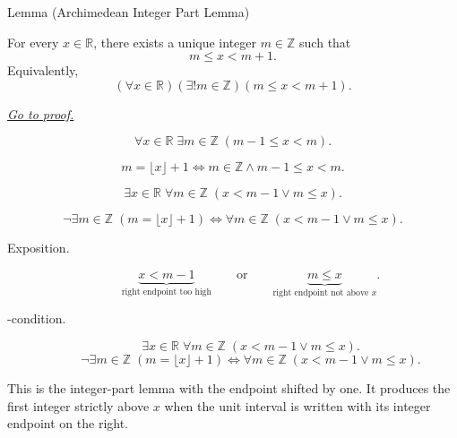 \begin{lemmabox}{Lemma (Archimedean Integer Part Lemma)}
\begin{lemma}
\label{lem:archimedean-integer-part-lemma}
For every $x\in\mathbb{R}$, there exists a unique integer $m\in\mathbb{Z}$
such that
\[
  m\leq x<m+1.
\]
Equivalently,
\[
  (\forall x\in\mathbb{R})(\exists!m\in\mathbb{Z})(m\leq x<m+1).
\]

\smallskip
\noindent
\hyperref[prf:archimedean-integer-part-lemma]{\textit{Go to proof.}}
\end{lemma}
\end{lemmabox}

\begin{remark*}
\[
\forall x\in\mathbb{R}\;\exists m\in\mathbb{Z}\;(m-1\le x<m).
\]
\end{remark*}

\begin{remark*}
\[
m=\lfloor x\rfloor+1
\Longleftrightarrow
m\in\mathbb{Z}\land m-1\le x<m.
\]
\end{remark*}

\begin{remark*}
\[
\exists x\in\mathbb{R}\;\forall m\in\mathbb{Z}\;(x<m-1\lor m\le x).
\]
\end{remark*}

\begin{remark*}
\[
\neg\exists m\in\mathbb{Z}\;(m=\lfloor x\rfloor+1)
\Longleftrightarrow
\forall m\in\mathbb{Z}\;(x<m-1\lor m\le x).
\]
\end{remark*}

\begin{remark*}
\begin{description}
  \item[Exposition.]
\[
\underbrace{x<m-1}_{\text{right endpoint too high}}
\qquad\text{or}\qquad
\underbrace{m\le x}_{\text{right endpoint not above }x}.
\]


  \item[\exists-condition.]
  \[
\exists x\in\mathbb{R}\;\forall m\in\mathbb{Z}\;(x<m-1\lor m\le x).
\]
\[
\neg\exists m\in\mathbb{Z}\;(m=\lfloor x\rfloor+1)
\Longleftrightarrow
\forall m\in\mathbb{Z}\;(x<m-1\lor m\le x).
\]
\end{description}
\end{remark*}

\begin{remark*}[Interpretation]
This is the integer-part lemma with the endpoint shifted by one.  It produces
the first integer strictly above $x$ when the unit interval is written with its
integer endpoint on the right.
\end{remark*}

